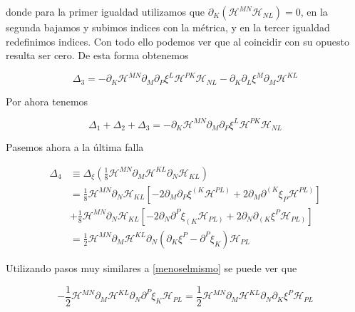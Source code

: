 \documentclass{article}
\numberwithin{equation}{section}
\begin{document}
donde para la primer igualdad utilizamos que $ \partial_K\left( \mathcal{H}^{MN}\mathcal{H}_{NL}\right) = 0 $, en la segunda bajamos y subimos indices con la métrica, y en la tercer igualdad redefinimos indices. Con todo ello podemos ver que al coincidir con su opuesto resulta ser cero. De esta forma obtenemos

\begin{equation}\label{key}
\Delta_3 = -\partial_K \mathcal{H}^{MN}\partial_M\partial_P \xi^L \mathcal{H}^{PK}\mathcal{H}_{NL} - \partial_K\partial_L\xi^M\partial_M\mathcal{H}^{KL}
\end{equation}

Por ahora tenemos

\begin{equation}\label{key}
\Delta_1 + \Delta_2 + \Delta_3 = -\partial_K \mathcal{H}^{MN}\partial_M\partial_P \xi^L \mathcal{H}^{PK}\mathcal{H}_{NL}
\end{equation}

Pasemos ahora a la última falla

\begin{equation}\label{key}
\begin{aligned}
\Delta_4 &\equiv \Delta_{\xi} \left( \frac{1}{8} \mathcal{H}^{MN}\partial_M \mathcal{H}^{KL}\partial_N \mathcal{H}_{KL} \right)\\
&= \frac{1}{8} \mathcal{H}^{MN}\partial_N \mathcal{H}_{KL} \left[ - 2\partial_M \partial_P \xi^{\left(K\right.} \mathcal{H}^{\left.PL\right)} + 2\partial_M \partial^{\left(K\right.}\xi_P \mathcal{H}^{\left.PL\right)}  \right]\\
&+ \frac{1}{8} \mathcal{H}^{MN}\partial_N \mathcal{H}_{KL} \left[ - 2\partial_N \partial^P \xi_{\left(K\right.} \mathcal{H}_{\left.PL\right)} + 2\partial_N \partial_{\left(K\right.}\xi^P \mathcal{H}_{\left.PL\right)}  \right]\\
&= \frac{1}{2}\mathcal{H}^{MN}\partial_M \mathcal{H}^{KL}\partial_N \left( \partial_K \xi^P - \partial^P \xi_K\right)\mathcal{H}_{PL}
\end{aligned}
\end{equation}

Utilizando pasos muy similares a \ref{menoselmismo} se puede ver que

\begin{equation}\label{key}
- \frac{1}{2}\mathcal{H}^{MN}\partial_M \mathcal{H}^{KL}\partial_N\partial^P \xi_K\mathcal{H}_{PL} = \frac{1}{2}\mathcal{H}^{MN}\partial_M \mathcal{H}^{KL}\partial_N\partial_K \xi^P\mathcal{H}_{PL}
\end{equation}
\end{document}

